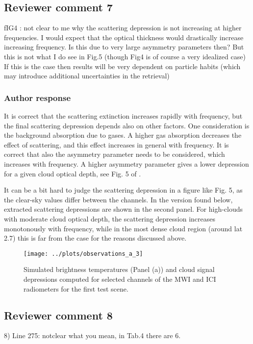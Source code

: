 \documentclass[11pt]{scrartcl}
\begin{document}
\subsection*{Reviewer comment 7}

fIG4 : not clear to me why the scattering depression is not increasing at
higher frequencies. I would expect that the optical thickness would drastically
increase increasing frequency. Is this due to very large asymmetry parameters
then? But this is not what I do see in Fig.5 (though Fig4 is of course a very
idealized case) If this is the case then results will be very dependent on
particle habits (which may introduce additional uncertainties in the retrieval)

\subsubsection*{Author response}

It is correct that the scattering extinction increases rapidly with frequency, but the
final scattering depression depends also on other factors. One consideration is the
background absorption due to gases. A higher gas absorption decreases the effect of
scattering, and this effect increases in general with frequency. It is correct that also
the asymmetry parameter needs to be considered, which increases with frequency. A higher
asymmetry parameter gives a lower depression for a given cloud optical depth, see Fig. 5
of \citet{eriksson15}.

It can be a bit hard to judge the scattering depression in a figure like Fig. 5,
as the clear-sky values differ between the channels. In the version found below,
extracted scattering depressions are shown in the second panel. For high-clouds
with moderate cloud optical depth, the scattering depression increases
monotonously with frequency, while in the most dense cloud region (around lat
2.7) this is far from the case for the reasons discussed above.


\begin{figure}[!hbpt]
  \centering
  \texttt{[image: ../plots/observations\_a\_3]}
  \caption{Simulated brightness temperatures (Panel (a)) and cloud signal
    depressions computed for selected channels of the MWI and ICI radiometers
    for the first test scene.}
  \label{fig:depressions}
\end{figure}

\subsection*{Reviewer comment 8}
8) Line 275: notclear what you mean, in Tab.4 there are 6. 
\end{document}
